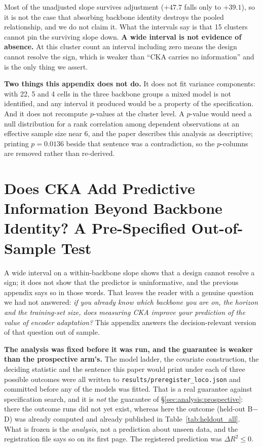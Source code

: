 Most of the unadjusted slope survives adjustment ($+47.7$ falls only to
$+39.1$), so it is not the case that absorbing backbone identity destroys the
pooled relationship, and we do not claim it. What the intervals say is that 15
clusters cannot pin the surviving slope down. \textbf{A wide interval is not
evidence of absence.} At this cluster count an interval including zero means the
design cannot resolve the sign, which is weaker than ``CKA carries no
information'' and is the only thing we assert.

\textbf{Two things this appendix does not do.} It does not fit variance
components: with 22, 5 and 4 cells in the three backbone groups a mixed model is
not identified, and any interval it produced would be a property of the
specification. And it does not recompute $p$-values at the cluster level. A
$p$-value would need a null distribution for a rank correlation among dependent
observations at an effective sample size near 6, and the paper describes this
analysis as descriptive; printing $p{=}0.0136$ beside that sentence was a
contradiction, so the $p$-columns are removed rather than re-derived.

\section{Does CKA Add Predictive Information Beyond Backbone Identity? A Pre-Specified
Out-of-Sample Test}
\label{app:loco}

A wide interval on a within-backbone slope shows that a design cannot resolve a
sign; it does not show that the predictor is uninformative, and the previous
appendix says so in those words.  That leaves the reader with a genuine question
we had not answered: \emph{if you already know which backbone you are on, the
horizon and the training-set size, does measuring CKA improve your prediction of
the value of encoder adaptation?}  This appendix answers the decision-relevant
version of that question out of sample.

\textbf{The analysis was fixed before it was run, and the guarantee is weaker than
the prospective arm's.}  The model ladder, the covariate construction, the
deciding statistic and the sentence this paper would print under each of three
possible outcomes were all written to
\texttt{results/preregister\_loco.json} and committed before any of the models was
fitted.  That is a real guarantee against specification search, and it is
\emph{not} the guarantee of \S\ref{sec:analysis:prospective}: there the outcome runs did not
yet exist, whereas here the outcome (held-out B$-$D) was already computed and
already published in Table~\ref{tab:heldout_all}.  What is frozen is the
\emph{analysis}, not a prediction about unseen data, and the registration file says
so on its first page.  The registered prediction was
$\Delta R^2 \leq 0$.

